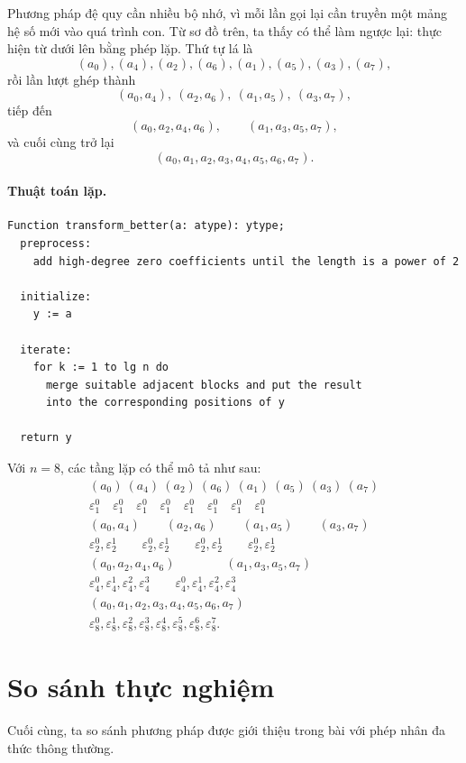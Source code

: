 \documentclass[11pt]{article}
\newcommand{\eps}{\varepsilon}
\begin{document}
Phương pháp đệ quy cần nhiều bộ nhớ, vì mỗi lần gọi lại cần truyền một mảng
hệ số mới vào quá trình con. Từ sơ đồ trên, ta thấy có thể làm ngược lại:
thực hiện từ dưới lên bằng phép lặp. Thứ tự lá là
\[
  (a_0),(a_4),(a_2),(a_6),(a_1),(a_5),(a_3),(a_7),
\]
rồi lần lượt ghép thành
\[
  (a_0,a_4),\ (a_2,a_6),\ (a_1,a_5),\ (a_3,a_7),
\]
tiếp đến
\[
  (a_0,a_2,a_4,a_6),\qquad (a_1,a_3,a_5,a_7),
\]
và cuối cùng trở lại
\[
  (a_0,a_1,a_2,a_3,a_4,a_5,a_6,a_7).
\]

\paragraph{Thuật toán lặp.}
\begin{verbatim}
Function transform_better(a: atype): ytype;
  preprocess:
    add high-degree zero coefficients until the length is a power of 2

  initialize:
    y := a

  iterate:
    for k := 1 to lg n do
      merge suitable adjacent blocks and put the result
      into the corresponding positions of y

  return y
\end{verbatim}

Với \(n=8\), các tầng lặp có thể mô tả như sau:
\[
\begin{array}{c}
(a_0)\ (a_4)\ (a_2)\ (a_6)\ (a_1)\ (a_5)\ (a_3)\ (a_7)\\
\eps_1^0\quad \eps_1^0\quad \eps_1^0\quad \eps_1^0\quad
\eps_1^0\quad \eps_1^0\quad \eps_1^0\quad \eps_1^0\\[0.8em]
(a_0,a_4)\qquad (a_2,a_6)\qquad (a_1,a_5)\qquad (a_3,a_7)\\
\eps_2^0,\eps_2^1\qquad \eps_2^0,\eps_2^1\qquad
\eps_2^0,\eps_2^1\qquad \eps_2^0,\eps_2^1\\[0.8em]
(a_0,a_2,a_4,a_6)\qquad\qquad (a_1,a_3,a_5,a_7)\\
\eps_4^0,\eps_4^1,\eps_4^2,\eps_4^3\qquad
\eps_4^0,\eps_4^1,\eps_4^2,\eps_4^3\\[0.8em]
(a_0,a_1,a_2,a_3,a_4,a_5,a_6,a_7)\\
\eps_8^0,\eps_8^1,\eps_8^2,\eps_8^3,\eps_8^4,\eps_8^5,\eps_8^6,\eps_8^7.
\end{array}
\]

\section{So sánh thực nghiệm}

Cuối cùng, ta so sánh phương pháp được giới thiệu trong bài với phép nhân
đa thức thông thường.
\end{document}
